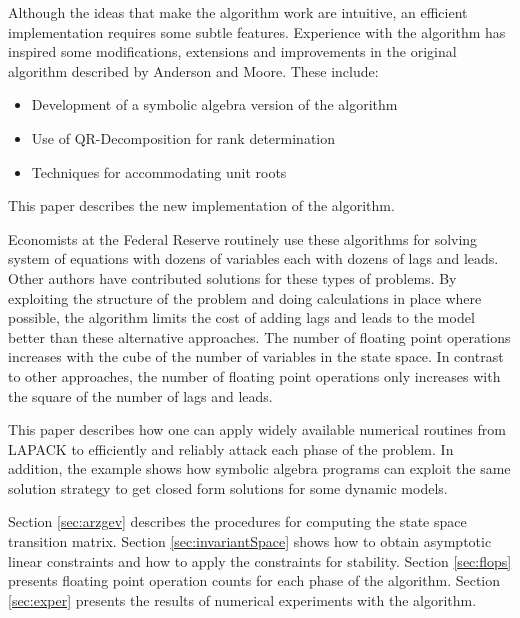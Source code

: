 \documentclass{article}
\begin{document}
{Although the ideas that make the algorithm work 
are intuitive, an efficient implementation requires some
subtle features.
Experience with the algorithm has inspired some modifications, extensions and
improvements in the original algorithm described by Anderson and Moore\cite{ANDER:AIM2}. These include:
\begin{itemize}
\item Development of a symbolic algebra version of the algorithm
\item Use of QR-Decomposition for rank determination
\item Techniques for accommodating unit roots
\end{itemize}
This paper describes the new implementation of the algorithm.

Economists at the Federal Reserve 
routinely use these algorithms for solving system of equations 
with dozens of variables each with dozens of
lags and leads.
Other authors\cite{Binder95,Zadrozny96,sims96}
have contributed solutions for these types of problems.
By exploiting the structure of the problem and
doing calculations in place where possible,
 the algorithm limits the cost of adding
lags and leads to the model better than these alternative approaches.
The number of floating point operations increases with the cube of the
number of  variables in the state space. In contrast to other approaches,
the number of 
floating point operations only increases with the square of the number of 
lags and leads.




This paper describes how one can apply widely available 
numerical routines from LAPACK to efficiently and reliably
attack each phase of the problem.
In addition,
the example shows how symbolic algebra programs can exploit the
same solution strategy to get closed form solutions for some dynamic models.


Section \ref{sec:arzgev} describes the procedures for computing the state 
space transition matrix. 
Section \ref{sec:invariantSpace} shows how to obtain asymptotic linear
constraints and how to apply
the constraints for stability.
Section \ref{sec:flops} presents floating point operation counts for each
phase of the algorithm.
Section \ref{sec:exper} presents the results of numerical experiments with
the algorithm.








}
\end{document}
